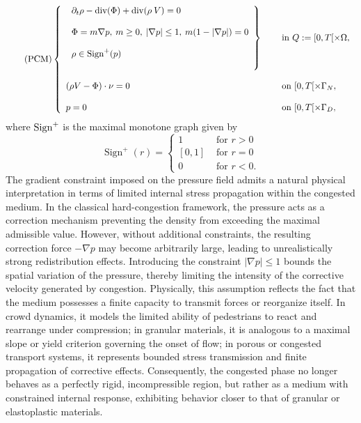 \documentclass[final,reqno]{amsart}
\theoremstyle{plain}
\theoremstyle{definition}
\theoremstyle{remark}
\numberwithin{remark}{section}	%
\numberwithin{example}{section}	%
\DeclareMathOperator{\dive}{div}
\begin{document}
\begin{equation}\tag{PCM}\label{evolgran0}
	\left\{
	\begin{array}{ll}
		\left. 	\begin{array}{l}
			\partial_t \rho -\dive (\Phi) +\dive(\rho \:  V)= 0 \\   \\
			\Phi=m \nabla p,\: m\geq0,  \: \vert \nabla p\vert \leq 1,\:  m(1-\vert \nabla p\vert)=0\\   \\
			\rho \in  \hbox{Sign}^+(p) \\ \\
		\end{array} \right\}  \quad & \hbox{ in } Q:=[0,T[ \times \Omega,\\  \\
		(\rho V - \Phi) \cdot \nu =0 & \hbox{ on }[0,T[ \times\Gamma_N,  \\  \\
		p=0    & \hbox{ on }[0,T[ \times\Gamma_D,
	\end{array}
	\right.
\end{equation}
where $\hbox{Sign}^{+}$ is the maximal monotone graph given by
\[
\operatorname{Sign}^{+}(r)=\left\{\begin{array}{cl}
	1 & \text { for } r>0 \\
	{[0,1]} & \text { for } r=0 \\
	0 & \text { for } r<0.
\end{array} \right.
\]
The gradient constraint imposed on the pressure field admits a natural physical interpretation in terms of limited internal stress propagation within the congested medium. In the classical hard-congestion framework, the pressure acts as a correction mechanism preventing the density from exceeding the maximal admissible value. However, without additional constraints, the resulting correction force $-\nabla p$ may become arbitrarily large, leading to unrealistically strong redistribution effects. Introducing the constraint $\vert \nabla p \vert \leq 1$ bounds the spatial variation of the pressure, thereby limiting the intensity of the corrective velocity generated by congestion. Physically, this assumption reflects the fact that the medium possesses a finite capacity to transmit forces or reorganize itself. In crowd dynamics, it models the limited ability of pedestrians to react and rearrange under compression; in granular materials, it is analogous to a maximal slope or yield criterion governing the onset of flow; in porous or congested transport systems, it represents bounded stress transmission and finite propagation of corrective effects. Consequently, the congested phase no longer behaves as a perfectly rigid, incompressible region, but rather as a medium with constrained internal response, exhibiting behavior closer to that of granular or elastoplastic materials.
\end{document}
